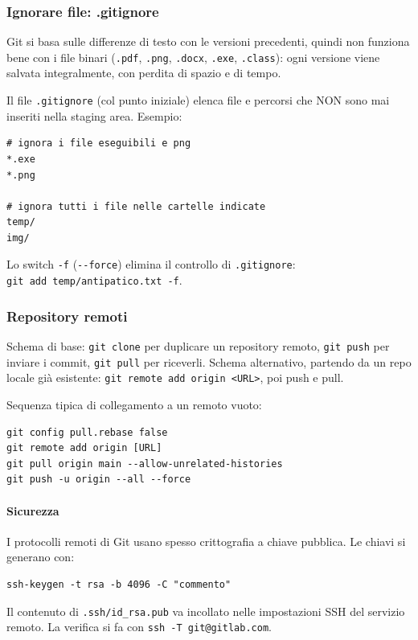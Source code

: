 \documentclass[a4paper,12pt]{article}
\begin{document}
\subsubsection{Ignorare file: .gitignore}

Git si basa sulle differenze di testo con le versioni precedenti, quindi non funziona
bene con i file binari (\texttt{.pdf}, \texttt{.png}, \texttt{.docx}, \texttt{.exe},
\texttt{.class}): ogni versione viene salvata integralmente, con perdita di spazio e di
tempo.

Il file \texttt{.gitignore} (col punto iniziale) elenca file e percorsi che NON sono mai
inseriti nella staging area. Esempio:

\begin{verbatim}
# ignora i file eseguibili e png
*.exe
*.png

# ignora tutti i file nelle cartelle indicate
temp/
img/
\end{verbatim}

Lo switch \verb|-f| (\verb|--force|) elimina il controllo di \texttt{.gitignore}:\\
\verb|git add temp/antipatico.txt -f|.

\subsubsection{Repository remoti}

Schema di base: \verb|git clone| per duplicare un repository remoto, \verb|git push| per
inviare i commit, \verb|git pull| per riceverli. Schema alternativo, partendo da un repo
locale già esistente: \verb|git remote add origin <URL>|, poi push e pull.

Sequenza tipica di collegamento a un remoto vuoto:
\begin{verbatim}
git config pull.rebase false
git remote add origin [URL]
git pull origin main --allow-unrelated-histories
git push -u origin --all --force
\end{verbatim}

\paragraph{Sicurezza} I protocolli remoti di Git usano spesso crittografia a chiave
pubblica. Le chiavi si generano con:
\begin{verbatim}
ssh-keygen -t rsa -b 4096 -C "commento"
\end{verbatim}
Il contenuto di \texttt{.ssh/id\_rsa.pub} va incollato nelle impostazioni SSH del
servizio remoto. La verifica si fa con \verb|ssh -T git@gitlab.com|.
\end{document}
